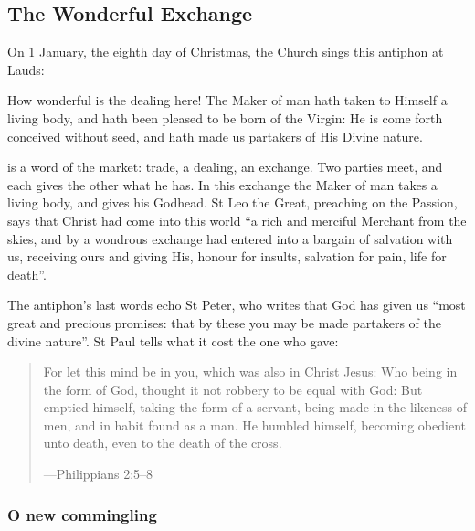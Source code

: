 \subsection{The Wonderful Exchange}\label{sec:exchange}

On 1 January, the eighth day of Christmas, the Church sings this antiphon at
Lauds:

\begin{studyframe}
\medskip

How wonderful is the dealing here! The Maker of man hath taken to Himself a
living body, and hath been pleased to be born of the Virgin: He is come forth
conceived without seed, and hath made us partakers of His Divine nature.\par
\end{studyframe}

 is a word of the market: trade, a dealing, an exchange. Two
parties meet, and each gives the other what he has. In this exchange the Maker
of man takes a living body, and gives his Godhead. St Leo the Great, preaching
on the Passion, says that Christ had come into this world ``a rich and merciful
Merchant from the skies, and by a wondrous exchange had entered into a bargain
of salvation with us, receiving ours and giving His, honour for insults,
salvation for pain, life for death''.

The antiphon's last words echo St Peter, who writes that God has given us
``most great and precious promises: that by these you may be made partakers of
the divine nature''. St Paul tells what it cost the one who gave:

\begin{quote}
For let this mind be in you, which was also in Christ Jesus: Who being in the
form of God, thought it not robbery to be equal with God: But emptied himself,
taking the form of a servant, being made in the likeness of men, and in habit
found as a man. He humbled himself, becoming obedient unto death, even to the
death of the cross.\par
{\smallskip\noindent\small ---Philippians 2:5--8\par}
\end{quote}

\subsubsection*{O new commingling}

